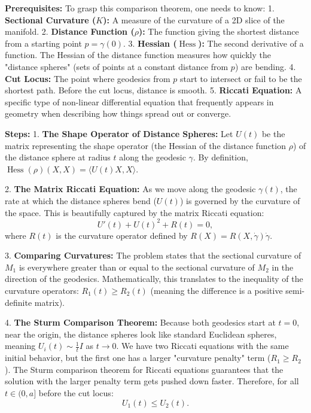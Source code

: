 \begin{solution}
\textbf{Prerequisites:}
To grasp this comparison theorem, one needs to know:
1. \textbf{Sectional Curvature ($K$):} A measure of the curvature of a 2D slice of the manifold.
2. \textbf{Distance Function ($\rho$):} The function giving the shortest distance from a starting point $p = \gamma(0)$.
3. \textbf{Hessian ($\operatorname{Hess}$):} The second derivative of a function. The Hessian of the distance function measures how quickly the "distance spheres" (sets of points at a constant distance from $p$) are bending.
4. \textbf{Cut Locus:} The point where geodesics from $p$ start to intersect or fail to be the shortest path. Before the cut locus, distance is smooth.
5. \textbf{Riccati Equation:} A specific type of non-linear differential equation that frequently appears in geometry when describing how things spread out or converge.
\par\vspace{\baselineskip}

\textbf{Steps:}
1. \textbf{The Shape Operator of Distance Spheres:}
Let $U(t)$ be the matrix representing the shape operator (the Hessian of the distance function $\rho$) of the distance sphere at radius $t$ along the geodesic $\gamma$. By definition, $\operatorname{Hess}(\rho)(X, X) = \langle U(t)X, X \rangle$.
\par\vspace{\baselineskip}

2. \textbf{The Matrix Riccati Equation:}
As we move along the geodesic $\gamma(t)$, the rate at which the distance spheres bend ($U(t)$) is governed by the curvature of the space. This is beautifully captured by the matrix Riccati equation:
\[ U'(t) + U(t)^2 + R(t) = 0, \]
where $R(t)$ is the curvature operator defined by $R(X) = R(X, \dot{\gamma})\dot{\gamma}$.
\par\vspace{\baselineskip}

3. \textbf{Comparing Curvatures:}
The problem states that the sectional curvature of $M_1$ is everywhere greater than or equal to the sectional curvature of $M_2$ in the direction of the geodesics. Mathematically, this translates to the inequality of the curvature operators: $R_1(t) \ge R_2(t)$ (meaning the difference is a positive semi-definite matrix).
\par\vspace{\baselineskip}

4. \textbf{The Sturm Comparison Theorem:}
Because both geodesics start at $t=0$, near the origin, the distance spheres look like standard Euclidean spheres, meaning $U_i(t) \sim \frac{1}{t} I$ as $t \to 0$. We have two Riccati equations with the same initial behavior, but the first one has a larger "curvature penalty" term ($R_1 \ge R_2$). The Sturm comparison theorem for Riccati equations guarantees that the solution with the larger penalty term gets pushed down faster. Therefore, for all $t \in (0, a]$ before the cut locus:
\[ U_1(t) \le U_2(t). \]
\par\vspace{\baselineskip}


\end{solution}

